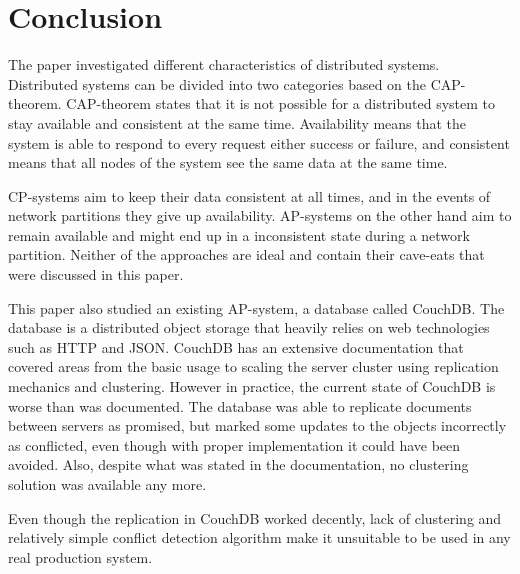 \section{Conclusion}

The paper investigated different characteristics of distributed systems.
Distributed systems can be divided into two categories based on the
CAP-theorem. CAP-theorem states that it is not possible for a distributed system
to stay available and consistent at the same time. Availability means that the
system is able to respond to every request either success or failure, and
consistent means that all nodes of the system see the same data at the same
time.

CP-systems aim to keep their data consistent at all times, and in the events of
network partitions they give up availability. AP-systems on the other hand aim
to remain available and might end up in a inconsistent state during a network
partition. Neither of the approaches are ideal and contain their cave-eats that
were discussed in this paper.

This paper also studied an existing AP-system, a database called CouchDB. The
database is a distributed object storage that heavily relies on web technologies
such as HTTP and JSON. CouchDB has an extensive documentation that covered areas
from the basic usage to scaling the server cluster using replication mechanics
and clustering. However in practice, the current state of CouchDB is worse than
was documented. The database was able to replicate documents between servers as
promised, but marked some updates to the objects incorrectly as conflicted, even
though with proper implementation it could have been avoided. Also, despite what
was stated in the documentation, no clustering solution was available any more.

Even though the replication in CouchDB worked decently, lack of clustering and
relatively simple conflict detection algorithm make it unsuitable to be used in
any real production system.
